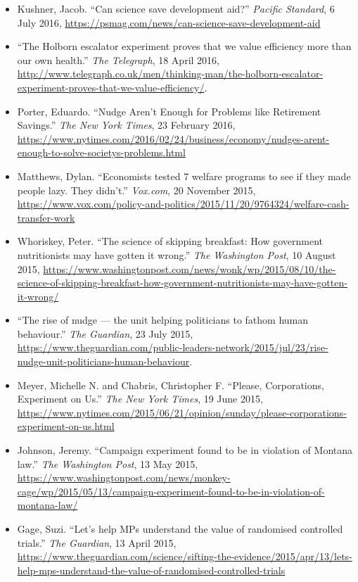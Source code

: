 \documentclass[12pt,a4paper]{article}
\begin{document}
\begin{itemize}
\item Kushner, Jacob. ``Can science save development aid?'' \textit{Pacific Standard}, 6 July 2016, \url{ https://psmag.com/news/can-science-save-development-aid}

\item ``The Holborn escalator experiment proves that we value efficiency more than our own health.'' \textit{The Telegraph}, 18 April 2016, \url{http://www.telegraph.co.uk/men/thinking-man/the-holborn-escalator-experiment-proves-that-we-value-efficiency/}.

\item Porter, Eduardo. ``Nudge Aren't Enough for Problems like Retirement Savings.'' \textit{The New York Times}, 23 February 2016, \url{https://www.nytimes.com/2016/02/24/business/economy/nudges-arent-enough-to-solve-societys-problems.html}

\item Matthews, Dylan. ``Economists tested 7 welfare programs to see if they made people lazy. They didn't.'' \textit{Vox.com}, 20 November 2015, \url{https://www.vox.com/policy-and-politics/2015/11/20/9764324/welfare-cash-transfer-work}

\item Whoriskey, Peter. ``The science of skipping breakfast: How government nutritionists may have gotten it wrong.'' \textit{The Washington Post}, 10 August 2015, \url{https://www.washingtonpost.com/news/wonk/wp/2015/08/10/the-science-of-skipping-breakfast-how-government-nutritionists-may-have-gotten-it-wrong/}

\item ``The rise of nudge --- the unit helping politicians to fathom human behaviour.'' \textit{The Guardian}, 23 July 2015, \url{https://www.theguardian.com/public-leaders-network/2015/jul/23/rise-nudge-unit-politicians-human-behaviour}.

\item Meyer, Michelle N. and Chabris, Christopher F. ``Please, Corporations, Experiment on Us.'' \textit{The New York Times}, 19 June 2015, \url{https://www.nytimes.com/2015/06/21/opinion/sunday/please-corporations-experiment-on-us.html}

\item Johnson, Jeremy. ``Campaign experiment found to be in violation of Montana law.'' \textit{The Washington Post}, 13 May 2015, \url{https://www.washingtonpost.com/news/monkey-cage/wp/2015/05/13/campaign-experiment-found-to-be-in-violation-of-montana-law/}

\item Gage, Suzi. ``Let's help MPs understand the value of randomised controlled trials.'' \textit{The Guardian}, 13 April 2015, \url{https://www.theguardian.com/science/sifting-the-evidence/2015/apr/13/lets-help-mps-understand-the-value-of-randomised-controlled-trials}


\end{itemize}
\end{document}
